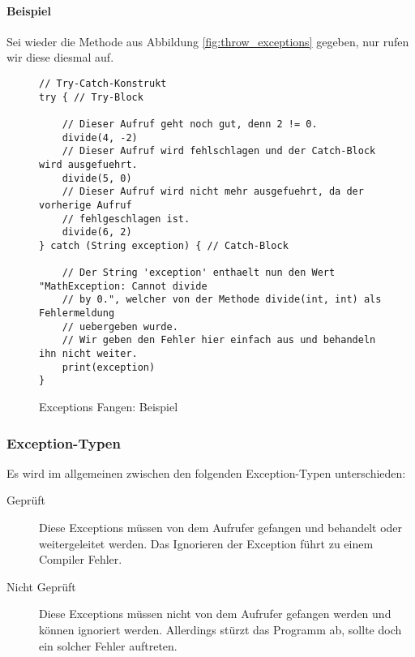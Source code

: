 		\paragraph{Beispiel}
			Sei wieder die Methode aus Abbildung \ref{fig:throw_exceptions} gegeben, nur rufen wir diese diesmal auf.
			\begin{figure}[H]
				\centering
				\begin{lstlisting}
// Try-Catch-Konstrukt
try { // Try-Block

	// Dieser Aufruf geht noch gut, denn 2 != 0.
	divide(4, -2)
	// Dieser Aufruf wird fehlschlagen und der Catch-Block wird ausgefuehrt.
	divide(5, 0)
	// Dieser Aufruf wird nicht mehr ausgefuehrt, da der vorherige Aufruf
	// fehlgeschlagen ist.
	divide(6, 2)
} catch (String exception) { // Catch-Block

	// Der String 'exception' enthaelt nun den Wert "MathException: Cannot divide
	// by 0.", welcher von der Methode divide(int, int) als Fehlermeldung
	// uebergeben wurde.
	// Wir geben den Fehler hier einfach aus und behandeln ihn nicht weiter.
	print(exception)
}
				\end{lstlisting}
				\caption{Exceptions Fangen: Beispiel}
			\end{figure}
	
	\subsubsection{Exception-Typen}
		Es wird im allgemeinen zwischen den folgenden Exception-Typen unterschieden:
		\begin{description}
			\item[Geprüft] Diese Exceptions müssen von dem Aufrufer gefangen und behandelt oder weitergeleitet werden. Das Ignorieren der Exception führt zu einem Compiler Fehler.
			\item[Nicht Geprüft] Diese Exceptions müssen nicht von dem Aufrufer gefangen werden und können ignoriert werden. Allerdings stürzt das Programm ab, sollte doch ein solcher Fehler auftreten.
		\end{description}
		
